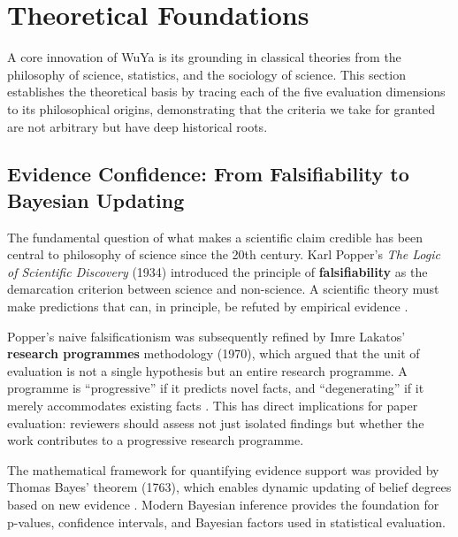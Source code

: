 \section{Theoretical Foundations}
\label{sec:theory}

A core innovation of WuYa is its grounding in classical theories from the philosophy of science, statistics, and the sociology of science. This section establishes the theoretical basis by tracing each of the five evaluation dimensions to its philosophical origins, demonstrating that the criteria we take for granted are not arbitrary but have deep historical roots.

\subsection{Evidence Confidence: From Falsifiability to Bayesian Updating}

The fundamental question of what makes a scientific claim credible has been central to philosophy of science since the 20th century. Karl Popper's \textit{The Logic of Scientific Discovery} (1934) introduced the principle of \textbf{falsifiability} as the demarcation criterion between science and non-science. A scientific theory must make predictions that can, in principle, be refuted by empirical evidence \citep{popper1959logic}.

Popper's naive falsificationism was subsequently refined by Imre Lakatos' \textbf{research programmes} methodology (1970), which argued that the unit of evaluation is not a single hypothesis but an entire research programme. A programme is ``progressive'' if it predicts novel facts, and ``degenerating'' if it merely accommodates existing facts \citep{lakatos1970falsification}. This has direct implications for paper evaluation: reviewers should assess not just isolated findings but whether the work contributes to a progressive research programme.

The mathematical framework for quantifying evidence support was provided by Thomas Bayes' theorem (1763), which enables dynamic updating of belief degrees based on new evidence \citep{bayes1763essay}. Modern Bayesian inference provides the foundation for p-values, confidence intervals, and Bayesian factors used in statistical evaluation.

